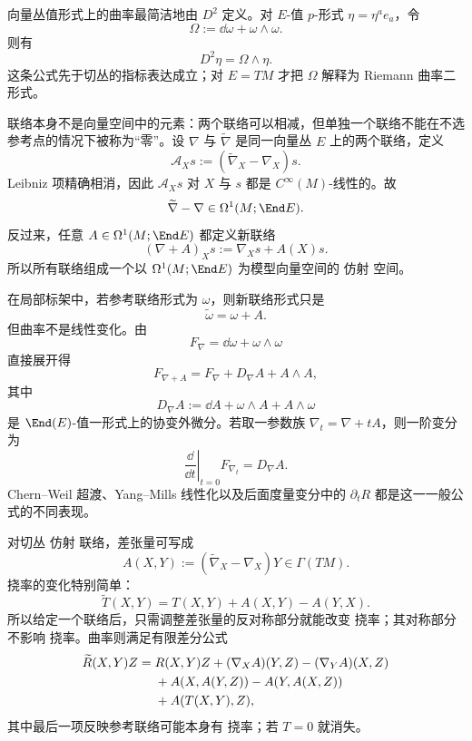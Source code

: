 向量丛值形式上的曲率最简洁地由 $D^2$ 定义。对 $E$-值 $p$-形式 $\eta=\eta^ae_a$，令
\[
\Omega:=\dd\omega+\omega\wedge\omega.
\]
则有
\begin{equation}\label{eq:math-dg-covariant-derivative-square}
{D^2\eta=\Omega\wedge\eta.}
\end{equation}
这条公式先于切丛的指标表达成立；对 $E=TM$ 才把 $\Omega$ 解释为 Riemann 曲率二形式。

联络本身不是向量空间中的元素：两个联络可以相减，但单独一个联络不能在不选参考点的情况下被称为“零”。设 $\nabla$ 与 $\widetilde\nabla$ 是同一向量丛 $E$ 上的两个联络，定义
\[
\mathcal A_Xs
:=(\widetilde\nabla_X-\nabla_X)s.
\]
Leibniz 项精确相消，因此 $\mathcal A_Xs$ 对 $X$ 与 $s$ 都是 $C^\infty(M)$-线性的。故
\begin{equation*}{
\widetilde\nabla-\nabla
\in\Omega^1(M;\End E).
}\end{equation*}
反过来，任意 $A\in\Omega^1(M;\End E)$ 都定义新联络
\[
(\nabla+A)_Xs:=\nabla_Xs+A(X)s.
\]
所以所有联络组成一个以 $\Omega^1(M;\End E)$ 为模型向量空间的 仿射 空间。

在局部标架中，若参考联络形式为 $\omega$，则新联络形式只是
\[
\widetilde\omega=\omega+A.
\]
但曲率不是线性变化。由
\[
F_\nabla=\dd\omega+\omega\wedge\omega
\]
直接展开得
\begin{equation}
{
F_{\nabla+A}
=F_\nabla+D_\nabla A+A\wedge A,
}
\label{eq:math-dg-curvature-finite-perturbation}
\end{equation}
其中
\[
D_\nabla A
:=\dd A+\omega\wedge A+A\wedge\omega
\]
是 $\End(E)$-值一形式上的协变外微分。若取一参数族 $\nabla_t=\nabla+tA$，则一阶变分为
\begin{equation*}\left.\frac{\dd}{\dd t}\right|_{t=0}F_{\nabla_t}
=D_\nabla A.\end{equation*}
Chern--Weil 超渡、Yang--Mills 线性化以及后面度量变分中的 $\partial_tR$ 都是这一一般公式的不同表现。

对切丛 仿射 联络，差张量可写成
\[
A(X,Y):=(\widetilde\nabla_X-\nabla_X)Y
\in\Gamma(TM).
\]
挠率的变化特别简单：
\begin{equation*}{
\widetilde T(X,Y)
=T(X,Y)+A(X,Y)-A(Y,X).
}\end{equation*}
所以给定一个联络后，只需调整差张量的反对称部分就能改变 挠率；其对称部分不影响 挠率。曲率则满足有限差分公式
\begin{align}
\widetilde R(X,Y)Z
={}&R(X,Y)Z
+(\nabla_XA)(Y,Z)-(\nabla_YA)(X,Z)\notag\\
&+A(X,A(Y,Z))-A(Y,A(X,Z))\notag\\
&+A(T(X,Y),Z),
\label{eq:math-dg-curvature-connection-change}
\end{align}
其中最后一项反映参考联络可能本身有 挠率；若 $T=0$ 就消失。

